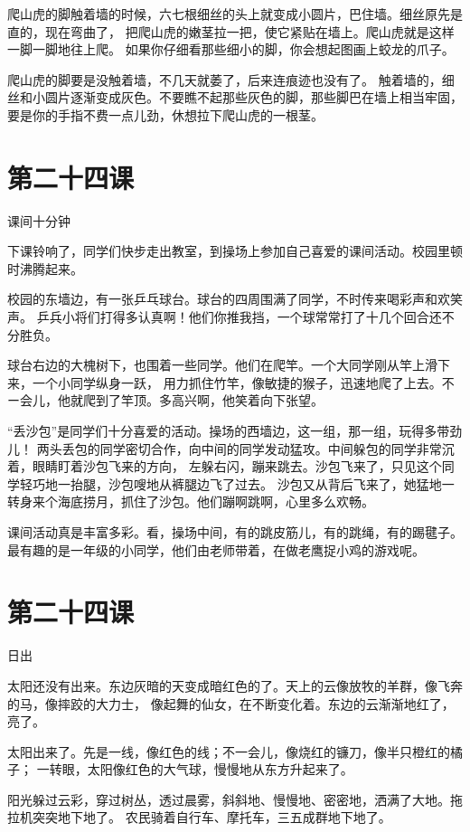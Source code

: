 \documentclass[12pt,UTF8]{ctexbook}
\begin{document}
爬山虎的脚触着墙的时候，六七根细丝的头上就变成小圆片，巴住墙。细丝原先是直的，现在弯曲了，
把爬山虎的嫩茎拉一把，使它紧贴在墙上。爬山虎就是这样一脚一脚地往上爬。
如果你仔细看那些细小的脚，你会想起图画上蛟龙的爪子。

爬山虎的脚要是没触着墙，不几天就萎了，后来连痕迹也没有了。
触着墙的，细丝和小圆片逐渐变成灰色。不要瞧不起那些灰色的脚，那些脚巴在墙上相当牢固，
要是你的手指不费一点儿劲，休想拉下爬山虎的一根茎。

\section{第二十四课}

课间十分钟

下课铃响了，同学们快步走出教室，到操场上参加自己喜爱的课间活动。校园里顿时沸腾起来。

校园的东墙边，有一张乒乓球台。球台的四周围满了同学，不时传来喝彩声和欢笑声。
乒兵小将们打得多认真啊！他们你推我挡，一个球常常打了十几个回合还不分胜负。

球台右边的大槐树下，也围着一些同学。他们在爬竿。一个大同学刚从竿上滑下来，一个小同学纵身一跃，
用力抓住竹竿，像敏捷的猴子，迅速地爬了上去。不ー会儿，他就爬到了竿顶。多高兴啊，他笑着向下张望。

“丢沙包”是同学们十分喜爱的活动。操场的西墙边，这一组，那一组，玩得多带劲儿！
两头丢包的同学密切合作，向中间的同学发动猛攻。中间躲包的同学非常沉着，眼睛盯着沙包飞来的方向，
左躲右闪，蹦来跳去。沙包飞来了，只见这个同学轻巧地一抬腿，沙包嗖地从裤腿边飞了过去。
沙包又从背后飞来了，她猛地一转身来个海底捞月，抓住了沙包。他们蹦啊跳啊，心里多么欢畅。

课间活动真是丰富多彩。看，操场中间，有的跳皮筋儿，有的跳绳，有的踢毽子。
最有趣的是一年级的小同学，他们由老师带着，在做老鹰捉小鸡的游戏呢。

\section{第二十四课}

日出

太阳还没有出来。东边灰暗的天变成暗红色的了。天上的云像放牧的羊群，像飞奔的马，像摔跤的大力士，
像起舞的仙女，在不断变化着。东边的云渐渐地红了，亮了。

太阳出来了。先是一线，像红色的线；不一会儿，像烧红的镰刀，像半只橙红的橘子；
一转眼，太阳像红色的大气球，慢慢地从东方升起来了。

阳光躲过云彩，穿过树丛，透过晨雾，斜斜地、慢慢地、密密地，洒满了大地。拖拉机突突地下地了。
农民骑着自行车、摩托车，三五成群地下地了。
\end{document}
